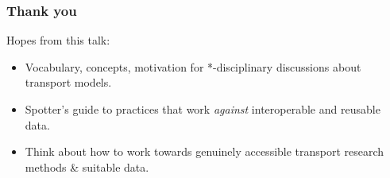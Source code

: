 \documentclass[14pt,aspectratio=169]{beamer}
\begin{document}
\begin{frame}
\frametitle{Thank you}

Hopes from this talk:
\begin{itemize}
  \item Vocabulary, concepts, motivation for *-disciplinary discussions about transport models.
  \item Spotter's guide to practices that work \emph{against} interoperable and reusable data.
  \item Think about how to work towards genuinely accessible transport research methods \& suitable data.
\end{itemize}

\end{frame}
\end{document}
